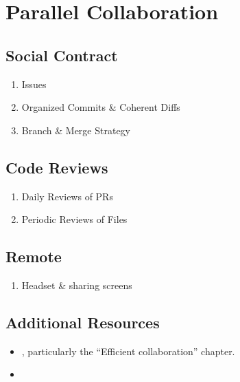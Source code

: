\documentclass[
]{book}
\providecommand{\tightlist}{%
  \setlength{\itemsep}{0pt}\setlength{\parskip}{0pt}}
\begin{document}
\hypertarget{collaboration}{%
\chapter{Parallel Collaboration}\label{collaboration}}

\hypertarget{social-contract}{%
\section{Social Contract}\label{social-contract}}

\begin{enumerate}
\def\labelenumi{\arabic{enumi}.}
\tightlist
\item
  Issues
\item
  Organized Commits \& Coherent Diffs
\item
  Branch \& Merge Strategy
\end{enumerate}

\hypertarget{code-reviews}{%
\section{Code Reviews}\label{code-reviews}}

\begin{enumerate}
\def\labelenumi{\arabic{enumi}.}
\tightlist
\item
  Daily Reviews of PRs
\item
  Periodic Reviews of Files
\end{enumerate}

\hypertarget{remote}{%
\section{Remote}\label{remote}}

\begin{enumerate}
\def\labelenumi{\arabic{enumi}.}
\tightlist
\item
  Headset \& sharing screens
\end{enumerate}

\hypertarget{additional-resources-1}{%
\section{Additional Resources}\label{additional-resources-1}}

\begin{itemize}
\tightlist
\item
  \citep{gillespie}, particularly the ``Efficient collaboration'' chapter.
\item
  \citep{fitzpatrick}
\end{itemize}
\end{document}

